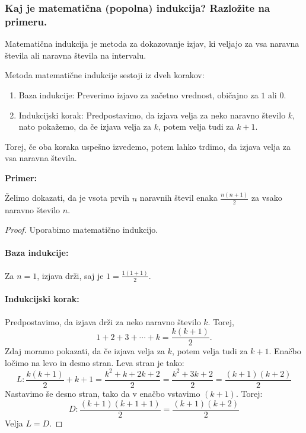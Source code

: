 \documentclass{article}
\begin{document}
\subsubsection*{Kaj je matematična (popolna) indukcija? Razložite na primeru.}

Matematična indukcija je metoda za dokazovanje izjav, ki veljajo za vsa naravna števila ali naravna števila na intervalu.

Metoda matematične indukcije sestoji iz dveh korakov:

\begin{enumerate}
    \item Baza indukcije: Preverimo izjavo za začetno vrednost, običajno za $1$ ali $0$.
    \item Indukcijski korak: Predpostavimo, da izjava velja za neko naravno število $k$, nato pokažemo, da če izjava velja za $k$, potem velja tudi za $k+1$.
\end{enumerate}

Torej, če oba koraka uspešno izvedemo, potem lahko trdimo, da izjava velja za vsa naravna števila.

\textbf{Primer:}

Želimo dokazati, da je vsota prvih $n$ naravnih števil enaka $\frac{n(n+1)}{2}$ za vsako naravno število $n$.

\begin{proof}
  Uporabimo matematično indukcijo.

  \paragraph*{Baza indukcije:} 
  Za $n = 1$, izjava drži, saj je $1 = \frac{1(1+1)}{2}$.

  \paragraph*{Indukcijski korak:}
  Predpostavimo, da izjava drži za neko naravno število $k$. Torej,
  \[
  1 + 2 + 3 + \cdots + k = \frac{k(k+1)}{2}.
  \]
  Zdaj moramo pokazati, da če izjava velja za $k$, potem velja tudi za $k+1$. Enačbo ločimo na levo in desno stran. Leva stran je tako:
 \[
    L: \frac{k(k+1)}{2} + k + 1 = \frac{k^2 + k + 2k + 2}{2} = \frac{k^2 + 3k + 2}{2} = \frac{(k+1)(k+2)}{2}
 \]
    Nastavimo še desno stran, tako da v enačbo vstavimo $(k+1)$. Torej:
    \[
    D: \frac{(k+1)(k+1+1)}{2} = \frac{(k+1)(k+2)}{2}
    \]
    Velja $L=D$.
\end{proof}
\end{document}
